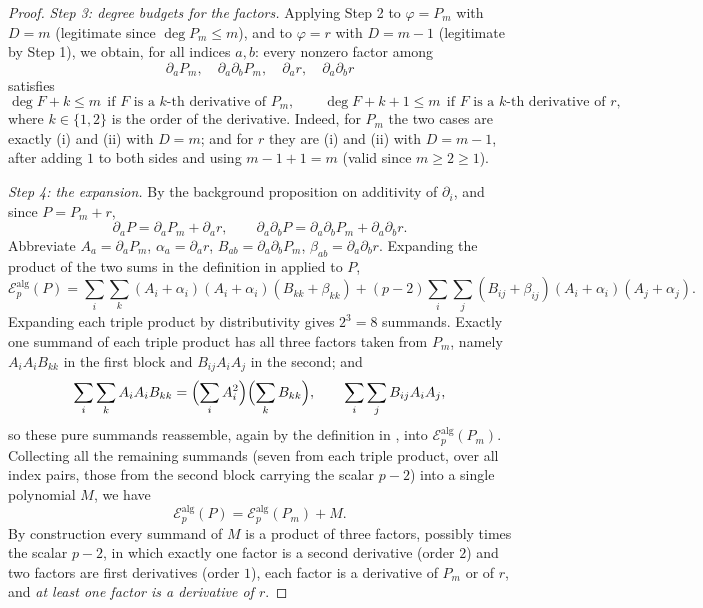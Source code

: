 \begin{proof}
\emph{Step 3: degree budgets for the factors.} Applying Step 2 to
$\varphi=P_m$ with $D=m$ (legitimate since $\deg P_m\le m$), and to
$\varphi=r$ with $D=m-1$ (legitimate by Step 1), we obtain, for all indices
$a,b$: every nonzero factor among
\[
  \partial_aP_m,\quad \partial_a\partial_bP_m,\quad \partial_ar,\quad
  \partial_a\partial_br
\]
satisfies
\begin{equation}\label{eq:tc-budget}
  \deg F+k\le m\ \ \text{if }F\text{ is a $k$-th derivative of }P_m,
  \qquad
  \deg F+k+1\le m\ \ \text{if }F\text{ is a $k$-th derivative of }r,
\end{equation}
where $k\in\{1,2\}$ is the order of the derivative. Indeed, for $P_m$ the two
cases are exactly (i) and (ii) with $D=m$; and for $r$ they are (i) and (ii)
with $D=m-1$, after adding $1$ to both sides and using $m-1+1=m$ (valid since
$m\ge2\ge1$).

\emph{Step 4: the expansion.} By the background proposition on additivity of
$\partial_i$, and since $P=P_m+r$,
\[
  \partial_aP=\partial_aP_m+\partial_ar,
  \qquad
  \partial_a\partial_bP=\partial_a\partial_bP_m+\partial_a\partial_br .
\]
Abbreviate $A_a=\partial_aP_m$, $\alpha_a=\partial_ar$,
$B_{ab}=\partial_a\partial_bP_m$, $\beta_{ab}=\partial_a\partial_br$. Expanding
the product of the two sums in the definition in  applied to $P$,
\[
  \mathcal{E}^{\mathrm{alg}}_p(P)
  =\sum_{i}\sum_{k}(A_i+\alpha_i)(A_i+\alpha_i)(B_{kk}+\beta_{kk})
   +(p-2)\sum_{i}\sum_{j}(B_{ij}+\beta_{ij})(A_i+\alpha_i)(A_j+\alpha_j).
\]
Expanding each triple product by distributivity gives $2^3=8$ summands. Exactly
one summand of each triple product has all three factors taken from $P_m$,
namely $A_iA_iB_{kk}$ in the first block and $B_{ij}A_iA_j$ in the second; and
\[
  \sum_i\sum_k A_iA_iB_{kk}=\Bigl(\sum_iA_i^2\Bigr)\Bigl(\sum_kB_{kk}\Bigr),
  \qquad
  \sum_i\sum_j B_{ij}A_iA_j,
\]
so these pure summands reassemble, again by the definition in ,
into $\mathcal{E}^{\mathrm{alg}}_p(P_m)$. Collecting all the remaining summands
(seven from each triple product, over all index pairs, those from the second
block carrying the scalar $p-2$) into a single polynomial $M$, we have
\begin{equation}\label{eq:tc-split}
  \mathcal{E}^{\mathrm{alg}}_p(P)=\mathcal{E}^{\mathrm{alg}}_p(P_m)+M .
\end{equation}
By construction every summand of $M$ is a product of three factors, possibly
times the scalar $p-2$, in which exactly one factor is a second derivative
(order $2$) and two factors are first derivatives (order $1$), each factor is a
derivative of $P_m$ or of $r$, and \emph{at least one factor is a derivative of
$r$}.


\end{proof}
